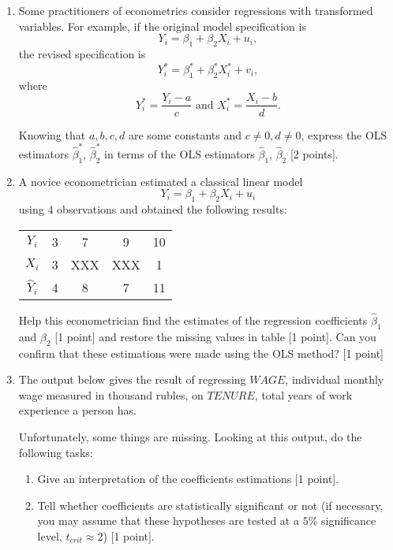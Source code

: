 \begin{enumerate}
    \item Some practitioners of econometrics consider regressions with transformed variables. 
    For example, if the original model specification is
\[
    Y_i = \beta_1 + \beta_2 X_i + u_i,
\]
the revised specification is
\[
    Y_i^* = \beta_1^* + \beta_2^* X_i^* + v_i,
\]
where
\[
    Y_i^* = \frac{Y_i - a}{c} \text{ and } X_i^* = \frac{X_i - b}{d}.
\]

Knowing that $a, b, c, d$ are some constants and $ c \ne 0, d \ne 0$, express the OLS estimators $\hat\beta_1^*$, $\hat\beta_2^*$ 
in terms of the OLS estimators $\hat\beta_1$, $\hat\beta_2$ [2 points].


\item A novice econometrician estimated a classical linear model 
\[
     Y_i = \beta_1 + \beta_2 X_i + u_i
\]
using 4 observations and obtained the following results:

\begin{tabular}{@{}ccccc@{}}
\toprule
 $Y_i$ & 3 & 7 & 9 & 10\\ 
 $X_i$ & 3 & XXX & XXX & 1\\ 
 $\hat Y_i$ & 4 & 8 & 7 & 11\\ 
\bottomrule
\end{tabular}

Help this econometrician find the estimates of the regression coefficients $\hat \beta_1$ and $\hat \beta_2$ [1 point] and restore the missing values in table [1 point]. 
Can you confirm that these estimations were made using the OLS method? [1 point]

\item 
The output below gives the result of regressing $WAGE$, individual monthly wage measured in thousand rubles, on $TENURE$, total years of work experience a person has.


Unfortunately, some things are missing. Looking at this output, do the following tasks:

\begin{enumerate}
    \item 
    Give an interpretation of the coefficients estimations [1 point].
    
    \item
    Tell whether coefficients are statistically significant or not (if necessary, you may assume that these hypotheses are tested at a $5\%$ significance level, $t_{crit} \approx 2$) [1 point].
    

\end{enumerate}
\end{enumerate}

